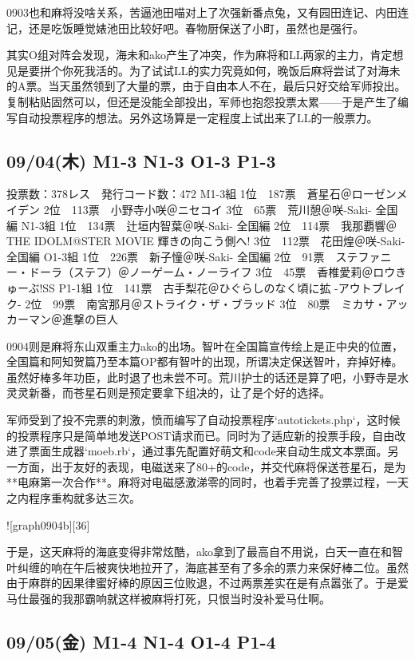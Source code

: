 0903也和麻将没啥关系，苦逼池田喵对上了次强新番点兔，又有园田连记、内田连记，还是吃饭睡觉婊池田比较好吧。春物厨保送了小町，虽然也是强行。

其实O组对阵会发现，海未和ako产生了冲突，作为麻将和LL两家的主力，肯定想见是要拼个你死我活的。为了试试LL的实力究竟如何，晚饭后麻将尝试了对海未的A票。当天虽然领到了大量的票，由于自由本人不在，最后只好交给军师投出。复制粘贴固然可以，但还是没能全部投出，军师也抱怨投票太累——于是产生了编写自动投票程序的想法。另外这场算是一定程度上试出来了LL的一般票力。

\subsection{09/04(木) M1-3 N1-3 O1-3 P1-3}

	投票数：378レス　発行コード数：472
	M1-3組
	1位　187票　蒼星石＠ローゼンメイデン
	2位　113票　小野寺小咲＠ニセコイ
	3位　65票　荒川憩＠咲-Saki- 全国編
	N1-3組
	1位　134票　辻垣内智葉＠咲-Saki- 全国編
	2位　114票　我那覇響＠THE IDOLM@STER MOVIE 輝きの向こう側へ!
	3位　112票　花田煌＠咲-Saki- 全国編
	O1-3組
	1位　226票　新子憧＠咲-Saki- 全国編
	2位　91票　ステファニー・ドーラ（ステフ）＠ノーゲーム・ノーライフ
	3位　45票　香椎愛莉＠ロウきゅーぶ!SS
	P1-1組
	1位　141票　古手梨花＠ひぐらしのなく頃に拡 -アウトブレイク-
	2位　99票　南宮那月＠ストライク・ザ・ブラッド
	3位　80票　ミカサ・アッカーマン＠進撃の巨人

0904则是麻将东山双重主力ako的出场。智叶在全国篇宣传绘上是正中央的位置，全国篇和阿知贺篇乃至本篇OP都有智叶的出现，所谓决定保送智叶，弃掉好棒。虽然好棒多年功臣，此时退了也未尝不可。荒川护士的话还是算了吧，小野寺是水灵灵新番，而苍星石则是预定要拿下组决的，让了是个好的选择。

军师受到了投不完票的刺激，愤而编写了自动投票程序`autotickets.php`，这时候的投票程序只是简单地发送POST请求而已。同时为了适应新的投票手段，自由改进了票面生成器`moeb.rb`，通过事先配置好萌文和code来自动生成文本票面。另一方面，出于友好的表现，电磁送来了80+的code，并交代麻将保送苍星石，是为**电麻第一次合作**。麻将对电磁感激涕零的同时，也着手完善了投票过程，一天之内程序重构就多达三次。

![graph0904b][36]

于是，这天麻将的海底变得非常炫酷，ako拿到了最高自不用说，白天一直在和智叶纠缠的响在午后被爽快地拉开了，海底甚至有了多余的票力来保好棒二位。虽然由于麻群的因果律蜜好棒的原因三位败退，不过两票差实在是有点嚣张了。于是爱马仕最强的我那霸响就这样被麻将打死，只恨当时没补爱马仕啊。

\subsection{09/05(金) M1-4 N1-4 O1-4 P1-4}

